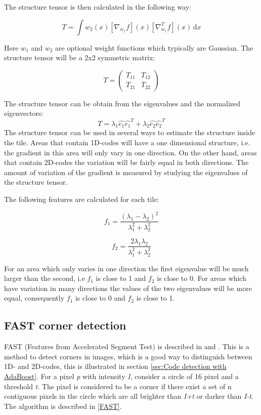 The structure tensor is then calculated in the following way:

\begin{equation}	
	T = \int w_2(x) [\nabla_{w_1} f](x)[\nabla_{w_1}^T f](x)\, \mathrm{d}x
\end{equation}

Here $w_1$ and $w_2$ are optional weight functions which typically are Gaussian. The structure tensor will be a 2x2 symmetric matrix:

\begin{equation}
	T = \begin{pmatrix}
			T_{11} & T_{12} \\ T_{21} & T_{22}
		\end{pmatrix}
\end{equation}

The structure tensor can be obtain from the eigenvalues and the normalized eigenvectors:
\begin{equation}
	T = \lambda_1 \hat{e_1}\hat{e_1}^T + \lambda_2 \hat{e_2}\hat{e_2}^T
\end{equation}
The structure tensor can be used in several ways to estimate the structure inside the tile. Areas that contain 1D-codes will have a one dimensional structure, i.e. the gradient in this area will only vary in one direction. On the other hand, areas that contain 2D-codes the variation will be fairly equal in both directions. The amount of variation of the gradient is measured by studying the eigenvalues of the structure tensor.

The following features are calculated for each tile:

\begin{equation}
f_1 = \frac{(\lambda_1 - \lambda_2)^2}{\lambda_1^2+\lambda_2^2}
\end{equation}

\begin{equation}
f_2 = \frac{2\lambda_1\lambda_2}{\lambda_1^2+\lambda_2^2}
\end{equation}

For an area which only varies in one direction the first eigenvalue will be much larger than the second, i.e $f_1$ is close to 1 and $f_2$ is close to 0. For areas which have variation in many directions the values of the two eigenvalues will be more equal, consequently $f_1$ is close to 0 and $f_2$ is close to 1. 

\subsection{FAST corner detection}
\label{sec:FAST corner detection}
FAST (Features from Accelerated Segment Test) is described in \citep{Rosten:2006} and \citep{Rosten:2005}. This is a method to detect corners in images, which is a good way to distinguish between 1D- and 2D-codes, this is illustrated in section \ref{sec:Code detection with AdaBoost}. For a pixel \textit{p} with intensity \textit{I}, consider a circle of 16 pixel and a threshold \textit{t}. The pixel is considered to be a corner if there exist a set of n contiguous pixels in the circle which are all brighter than \textit{I+t} or darker than \textit{I-t}. The algorithm is described in \ref{FAST}.

